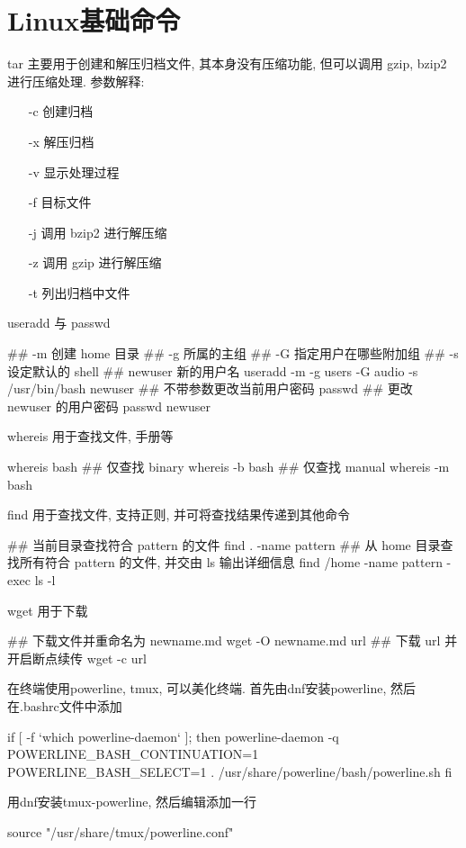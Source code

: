\chapter{Linux基础命令}


tar 主要用于创建和解压归档文件, 其本身没有压缩功能, 但可以调用 gzip, bzip2 进行压缩处理.
参数解释:
\begin{itemize}
 \item[-c] 创建归档
 \item[-x] 解压归档
 \item[-v] 显示处理过程
 \item[-f] 目标文件
 \item[-j] 调用 bzip2 进行解压缩
 \item[-z] 调用 gzip 进行解压缩
 \item[-t] 列出归档中文件
\end{itemize}

useradd 与 passwd
\begin{shell}
## -m 创建 home 目录
## -g 所属的主组
## -G 指定用户在哪些附加组
## -s 设定默认的 shell
## newuser 新的用户名
useradd -m -g users -G audio -s /usr/bin/bash newuser
## 不带参数更改当前用户密码
passwd
## 更改 newuser 的用户密码
passwd newuser
\end{shell}

whereis 用于查找文件, 手册等
\begin{shell}
whereis bash
## 仅查找 binary
whereis -b bash
## 仅查找 manual
whereis -m bash
\end{shell}

find 用于查找文件, 支持正则, 并可将查找结果传递到其他命令
\begin{shell}
## 当前目录查找符合 pattern 的文件
find . -name pattern
## 从 home 目录查找所有符合 pattern 的文件, 并交由 ls 输出详细信息
find /home -name pattern -exec ls -l {} \;
\end{shell}

wget 用于下载
\begin{shell}
## 下载文件并重命名为 newname.md
wget -O newname.md url
## 下载 url 并开启断点续传
wget -c url
\end{shell}


在终端使用powerline, tmux, 可以美化终端. 首先由dnf安装powerline, 
然后在.bashrc文件中添加
\begin{shell}
if [ -f `which powerline-daemon` ]; then
  powerline-daemon -q
  POWERLINE_BASH_CONTINUATION=1
  POWERLINE_BASH_SELECT=1
  . /usr/share/powerline/bash/powerline.sh
fi
\end{shell}
用dnf安装tmux-powerline, 然后编辑添加一行
\begin{shell}
 source "/usr/share/tmux/powerline.conf"
\end{shell}


